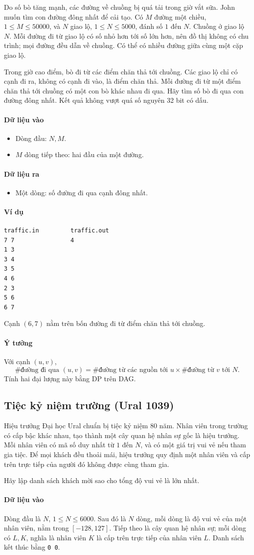 \documentclass[11pt]{article}
\newcommand{\problem}[1]{\subsection{#1}}
\newcommand{\iosec}[1]{\paragraph{#1}}
\begin{document}
Do số bò tăng mạnh, các đường về chuồng bị quá tải trong giờ vắt sữa. John muốn tìm con đường đông nhất để cải tạo. Có \(M\) đường một chiều, \(1 \le M \le 50000\), và \(N\) giao lộ, \(1 \le N \le 5000\), đánh số \(1\) đến \(N\). Chuồng ở giao lộ \(N\). Mỗi đường đi từ giao lộ có số nhỏ hơn tới số lớn hơn, nên đồ thị không có chu trình; mọi đường đều dẫn về chuồng. Có thể có nhiều đường giữa cùng một cặp giao lộ.

Trong giờ cao điểm, bò đi từ các điểm chăn thả tới chuồng. Các giao lộ chỉ có cạnh đi ra, không có cạnh đi vào, là điểm chăn thả. Mỗi đường đi từ một điểm chăn thả tới chuồng có một con bò khác nhau đi qua. Hãy tìm số bò đi qua con đường đông nhất. Kết quả không vượt quá số nguyên 32 bit có dấu.

\iosec{Dữ liệu vào}
\begin{itemize}
  \item Dòng đầu: \(N,M\).
  \item \(M\) dòng tiếp theo: hai đầu của một đường.
\end{itemize}

\iosec{Dữ liệu ra}
\begin{itemize}
  \item Một dòng: số đường đi qua cạnh đông nhất.
\end{itemize}

\iosec{Ví dụ}
\begin{verbatim}
traffic.in         traffic.out
7 7                4
1 3
3 4
3 5
4 6
2 3
5 6
6 7
\end{verbatim}

Cạnh \((6,7)\) nằm trên bốn đường đi từ điểm chăn thả tới chuồng.

\iosec{Ý tưởng}
Với cạnh \((u,v)\),
\[
  \#\text{đường đi qua }(u,v)
  =
  \#\text{đường từ các nguồn tới }u
  \times
  \#\text{đường từ }v\text{ tới }N.
\]
Tính hai đại lượng này bằng DP trên DAG.

\problem{Tiệc kỷ niệm trường (Ural 1039)}

Hiệu trưởng Đại học Ural chuẩn bị tiệc kỷ niệm \(80\) năm. Nhân viên trong trường có cấp bậc khác nhau, tạo thành một cây quan hệ nhân sự gốc là hiệu trưởng. Mỗi nhân viên có mã số duy nhất từ \(1\) đến \(N\), và có một giá trị vui vẻ nếu tham gia tiệc. Để mọi khách đều thoải mái, hiệu trưởng quy định một nhân viên và cấp trên trực tiếp của người đó không được cùng tham gia.

Hãy lập danh sách khách mời sao cho tổng độ vui vẻ là lớn nhất.

\iosec{Dữ liệu vào}
Dòng đầu là \(N\), \(1 \le N \le 6000\). Sau đó là \(N\) dòng, mỗi dòng là độ vui vẻ của một nhân viên, nằm trong \([-128,127]\). Tiếp theo là cây quan hệ nhân sự; mỗi dòng có \(L,K\), nghĩa là nhân viên \(K\) là cấp trên trực tiếp của nhân viên \(L\). Danh sách kết thúc bằng \texttt{0 0}.
\end{document}
